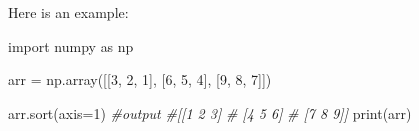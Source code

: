 \documentclass[11pt]{article}
\newenvironment{Shaded}{}{}
\newcommand{\DecValTok}[1]{\textcolor[rgb]{0.25,0.63,0.44}{{#1}}}
\newcommand{\CommentTok}[1]{\textcolor[rgb]{0.38,0.63,0.69}{\textit{{#1}}}}
\newcommand{\NormalTok}[1]{{#1}}
\newcommand{\ImportTok}[1]{{#1}}
\newcommand{\OperatorTok}[1]{\textcolor[rgb]{0.40,0.40,0.40}{{#1}}}
\newcommand{\BuiltInTok}[1]{{#1}}
\begin{document}
Here is an example:

\begin{Shaded}
\begin{Highlighting}[]
\ImportTok{import}\NormalTok{ numpy }\ImportTok{as}\NormalTok{ np}

\NormalTok{arr }\OperatorTok{=}\NormalTok{ np.array([[}\DecValTok{3}\NormalTok{, }\DecValTok{2}\NormalTok{, }\DecValTok{1}\NormalTok{],}
\NormalTok{                [}\DecValTok{6}\NormalTok{, }\DecValTok{5}\NormalTok{, }\DecValTok{4}\NormalTok{],}
\NormalTok{                [}\DecValTok{9}\NormalTok{, }\DecValTok{8}\NormalTok{, }\DecValTok{7}\NormalTok{]])}

\NormalTok{arr.sort(axis}\OperatorTok{=}\DecValTok{1}\NormalTok{)}
\CommentTok{\#output}
\CommentTok{\#[[1 2 3]}
\CommentTok{\# [4 5 6]}
\CommentTok{\# [7 8 9]]}
\BuiltInTok{print}\NormalTok{(arr)}
\end{Highlighting}
\end{Shaded}




    
    
    
\end{document}
